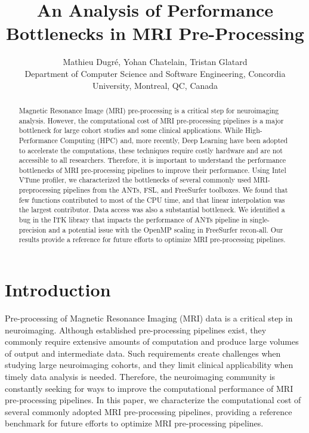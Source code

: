\documentclass[conference]{IEEEtran}
\title{An Analysis of Performance Bottlenecks in MRI Pre-Processing}
\author{Mathieu Dugr\'e, Yohan Chatelain, Tristan Glatard\\Department of Computer Science and Software Engineering, Concordia University, Montreal, QC, Canada}
\newcommand{\HL}[1]{\hl{#1}}
\begin{document}
\maketitle

\begin{abstract}
	Magnetic Resonance Image (MRI) pre-processing is a critical step for neuroimaging analysis. However, the computational cost of MRI pre-processing pipelines is a major bottleneck for large cohort studies and some clinical applications. While High-Performance Computing (HPC) and, more recently, Deep Learning have been adopted to accelerate the computations, these techniques require costly hardware and are not accessible to all researchers. Therefore, it is important to understand the performance bottlenecks of MRI pre-processing pipelines to improve their performance. Using Intel VTune profiler, we characterized the bottlenecks of several commonly used MRI-preprocessing pipelines from the ANTs, FSL, and FreeSurfer toolboxes. We found that few functions contributed to most of the CPU time, and that linear interpolation was the largest contributor. Data access was also  a substantial bottleneck. We identified a bug in the ITK library that impacts the performance of ANTs pipeline in single-precision and a potential issue with the OpenMP scaling in FreeSurfer recon-all. Our results provide a reference for future efforts to optimize MRI pre-processing pipelines.
\end{abstract}

\section{Introduction}
Pre-processing of Magnetic Resonance Imaging (MRI) data is a critical step in neuroimaging. Although established pre-processing pipelines exist, they commonly require extensive amounts of computation and produce large volumes of output and intermediate data. Such requirements create challenges when studying large neuroimaging cohorts, and they limit clinical applicability when timely data analysis is needed. Therefore, the neuroimaging community is constantly seeking for ways to improve the computational performance of MRI pre-processing pipelines. In this paper, we characterize the computational cost of several commonly adopted MRI pre-processing pipelines, providing a reference benchmark for future efforts to optimize MRI pre-processing pipelines.

\end{document}
